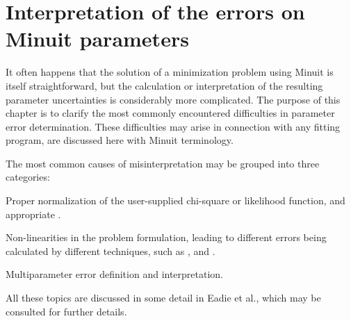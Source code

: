  
\chapter{Interpretation of the errors on Minuit parameters}
 
It often happens that the solution of a minimization problem using
Minuit is itself straightforward, but the calculation or
interpretation of the resulting parameter uncertainties is
considerably more complicated. The purpose of this chapter is to
clarify the most commonly encountered difficulties in parameter error
determination. These difficulties may arise in connection with any
fitting program, are discussed here with Minuit terminology.
 
The most common causes of misinterpretation may be grouped into 
three categories:
 
\begin{OL}
\item Proper normalization of the user-supplied chi-square or
  likelihood function, and appropriate .
\item Non-linearities in the problem formulation, leading to different
  errors being calculated by different techniques, such as
  ,  and .
\item Multiparameter error definition and interpretation.
\end{OL}
 
All these topics are discussed in some detail in Eadie et
al.\cite{bib-EADIE}, which may be consulted for further details.
 
